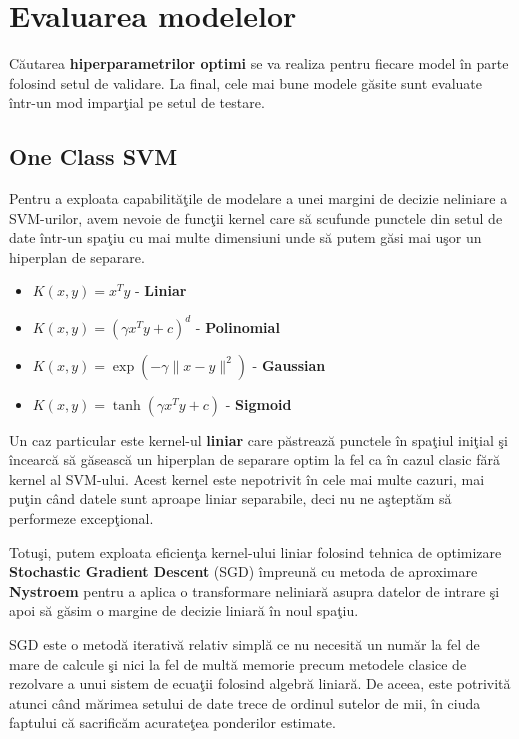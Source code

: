 \chapter{Evaluarea modelelor}

Căutarea \textbf{hiperparametrilor optimi} se va realiza pentru fiecare model 
în parte folosind setul de validare. La final, cele mai bune modele 
găsite sunt evaluate într-un mod imparţial pe setul de testare. 

\section{One Class SVM}

Pentru a exploata capabilităţile de modelare a unei margini de decizie 
neliniare a SVM-urilor, avem nevoie de funcţii kernel care să scufunde
punctele din setul de date într-un spaţiu cu mai multe dimensiuni unde 
să putem găsi mai uşor un hiperplan de separare.

\begin{itemize}
    \item \(K(x, y) = x^T y\) - \textbf{Liniar}
    \item \(K(x, y) = (\gamma x^T y + c)^d\) - \textbf{Polinomial}
    \item \(K(x, y) = \exp\left(-\gamma{\|x - y\|^2}\right)\) - \textbf{Gaussian}
    \item \(K(x, y) = \tanh(\gamma x^T y + c)\) - \textbf{Sigmoid}
\end{itemize}

Un caz particular este kernel-ul \textbf{liniar} care păstrează punctele
în spaţiul iniţial şi încearcă să găsească un hiperplan de separare 
optim la fel ca în cazul clasic fără kernel al SVM-ului.
Acest kernel este nepotrivit în cele mai multe cazuri, mai puţin când 
datele sunt aproape liniar separabile, deci nu ne aşteptăm să performeze
excepţional.

Totuşi, putem exploata eficienţa kernel-ului liniar folosind tehnica de 
optimizare \textbf{Stochastic Gradient Descent} (SGD) împreună cu metoda de aproximare 
\textbf{Nystroem} pentru a aplica o transformare neliniară asupra
datelor de intrare şi apoi să găsim o margine de decizie liniară în noul spaţiu.

SGD este o metodă iterativă relativ simplă ce nu necesită un număr la fel de 
mare de calcule şi nici la fel de multă memorie precum metodele clasice 
de rezolvare a unui sistem de ecuaţii folosind algebră liniară. De aceea, este
potrivită atunci când mărimea setului de date trece de ordinul sutelor de mii,
în ciuda faptului că sacrificăm acurateţea ponderilor estimate.

